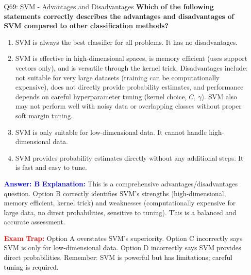 \documentclass[8pt]{beamer}
\begin{document}
	\begin{frame}{Q69: SVM - Advantages and Disadvantages}
		\fontsize{6.5}{7.5}\selectfont
		\textbf{Which of the following statements correctly describes the advantages and disadvantages of SVM compared to other classification methods?}
		
		\begin{enumerate}
			\item SVM is always the best classifier for all problems. It has no disadvantages.
			\item SVM is effective in high-dimensional spaces, is memory efficient (uses support vectors only), and is versatile through the kernel trick. Disadvantages include: not suitable for very large datasets (training can be computationally expensive), does not directly provide probability estimates, and performance depends on careful hyperparameter tuning (kernel choice, $C$, $\gamma$). SVM also may not perform well with noisy data or overlapping classes without proper soft margin tuning.
			\item SVM is only suitable for low-dimensional data. It cannot handle high-dimensional data.
			\item SVM provides probability estimates directly without any additional steps. It is fast and easy to tune.
		\end{enumerate}
		
		\vspace{0.1cm}
		\textcolor{blue}{\textbf{Answer: B}}
		\vspace{0.1cm}
		\textcolor{blue}{\textbf{Explanation:}} This is a comprehensive advantages/disadvantages question. Option B correctly identifies SVM's strengths (high-dimensional, memory efficient, kernel trick) and weaknesses (computationally expensive for large data, no direct probabilities, sensitive to tuning). This is a balanced and accurate assessment.
		
		\textcolor{red}{\textbf{Exam Trap:}} Option A overstates SVM's superiority. Option C incorrectly says SVM is only for low-dimensional data. Option D incorrectly says SVM provides direct probabilities. Remember: SVM is powerful but has limitations; careful tuning is required.
	\end{frame}
	
\end{document}
